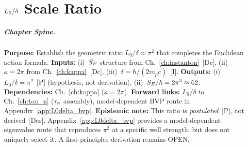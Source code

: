 
\chapter{$\Lzero/\bdelta$ Scale Ratio}
\label{ch:L0delta}


\begin{abstract}
Chapter~\ref{ch:kappa} established $\kappa = 2\pi$ from homotopy. The Euclidean
action $\SE/\hbar = \kappa \times (\Lzero/\bdelta)$ still requires the geometric
ratio $\Lzero/\bdelta$. This chapter examines the hypothesis that
$\Lzero/\bdelta \approx \pi^2$. We present geometric motivations from standing
wave quantization and resonance conditions, but the result remains [P]---a
physically motivated conjecture, not a rigorous derivation from the 5D action.
\end{abstract}

\paragraph{Chapter Spine.}
\textbf{Purpose:} Establish the geometric ratio $L_0/\delta \approx \pi^2$
that completes the Euclidean action formula.
\textbf{Inputs:} (i)~$S_E$ structure from Ch.~\ref{ch:instanton}~[Dc],
(ii)~$\kappa = 2\pi$ from Ch.~\ref{ch:kappa}~[Dc], (iii)~$\delta = \hbar/(2m_p c)$~[I].
\textbf{Outputs:} (i)~$L_0/\delta = \pi^2$~[P] (hypothesis, not derivation),
(ii)~$S_E/\hbar = 2\pi^3 \approx 62$.
\textbf{Dependencies:} Ch.~\ref{ch:kappa} ($\kappa = 2\pi$).
\textbf{Forward links:} $L_0/\delta$ to Ch.~\ref{ch:tau_n} ($\tau_n$ assembly),
model-dependent BVP route in Appendix~\ref{app:L0delta_bvp}.
\textbf{Epistemic note:} This ratio is \emph{postulated}~[P], not derived~[Der].
Appendix~\ref{app:L0delta_bvp} provides a model-dependent eigenvalue route that
reproduces $\pi^2$ at a specific well strength, but does not uniquely select it.
A first-principles derivation remains OPEN.

